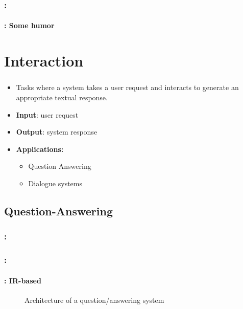 \documentclass[xcolor=table]{beamer}
\begin{document}
\begin{frame}
	\frametitle{\insertshortsubtitle: \insertsection}
	\framesubtitle{\insertsubsection: Some humor}
	
	\begin{center}
	\end{center}
	
\end{frame}

\section{Interaction}

\begin{frame}
	\frametitle{\insertshortsubtitle}
	\framesubtitle{\insertsection}
	
	\begin{itemize}
		\item Tasks where a system takes a user request and interacts to generate an appropriate textual response.
		\item \textbf{Input}: user request
		\item \textbf{Output}: system response
		\item \textbf{Applications:}
		\begin{itemize}
			\item Question Answering
			\item Dialogue systems
		\end{itemize}
	\end{itemize}

\end{frame}

\subsection{Question-Answering}

\begin{frame}
	\frametitle{\insertshortsubtitle: \insertsection}
	\framesubtitle{\insertsubsection}

\end{frame}

\begin{frame}
	\frametitle{\insertshortsubtitle: \insertsection}
	\framesubtitle{\insertsubsection: IR-based}
	
	\begin{figure}
		\caption{Architecture of a question/answering system \cite{2019-jurafsky-martin}}
	\end{figure}
	
\end{frame}
\end{document}
